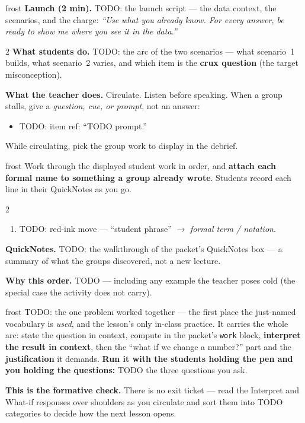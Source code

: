 \documentclass[10pt]{article}
\begin{document}
\boxguard
\begin{skillbox}{frost}
\textbf{Launch (2 min).} TODO: the launch script --- the data context, the scenarios, and the
charge: \emph{``Use what you already know. For every answer, be ready to show me where you see
it in the data.''}

\begin{multicols}{2}
\textbf{What students do.} TODO: the arc of the two scenarios --- what scenario~1 builds, what
scenario~2 varies, and which item is the \textbf{crux question} (the target misconception).

\columnbreak
\textbf{What the teacher does.} Circulate. Listen before speaking. When a group stalls, give a
\emph{question, cue, or prompt}, not an answer:
\begin{itemize}[leftmargin=1.1em, nosep]
  \item TODO: item ref: ``TODO prompt.''
\end{itemize}
While circulating, pick the group work to display in the debrief.
\end{multicols}
\end{skillbox}

\boxguard
\begin{skillbox}{frost}
Work through the displayed student work in order, and \textbf{attach each formal name to something
a group already wrote}. Students record each line in their QuickNotes as you go.
\begin{multicols}{2}
\begin{enumerate}[leftmargin=1.3em, nosep, itemsep=3pt]
  \item TODO: red-ink move --- ``student phrase'' $\to$ \emph{formal term / notation}.
\end{enumerate}
\columnbreak
\textbf{QuickNotes.} TODO: the walkthrough of the packet's QuickNotes box --- a summary of what
the groups discovered, not a new lecture.

\textbf{Why this order.} TODO --- including any example the teacher poses cold (the special case
the activity does not carry).
\end{multicols}
\end{skillbox}

\boxguard
\begin{skillbox}{frost}
TODO: the one problem worked together --- the first place the just-named vocabulary is \emph{used},
and the lesson's only in-class practice. It carries the whole arc: state the question in context,
compute in the packet's \texttt{work} block, \textbf{interpret the result in context}, then the
``what if we change a number?'' part and the \textbf{justification} it demands.
\textbf{Run it with the students holding the pen and you holding the questions:} TODO the three
questions you ask.

\textbf{This is the formative check.} There is no exit ticket --- read the Interpret and What-if
responses over shoulders as you circulate and sort them into TODO categories to decide how the
next lesson opens.
\end{skillbox}
\end{document}

